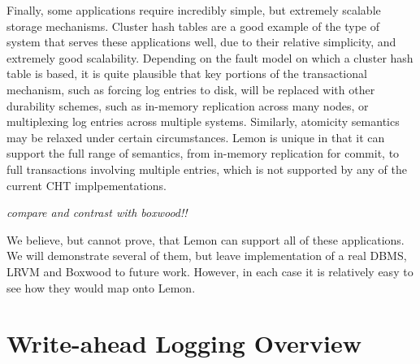 \documentclass[letterpaper,twocolumn,english]{article}
\newcommand{\yad}{Lemon\xspace}
\begin{document}

Finally, some applications require incredibly simple, but extremely
scalable storage mechanisms.  Cluster hash tables are a good example
of the type of system that serves these applications well, due to
their relative simplicity, and extremely good scalability.  Depending
on the fault model on which a cluster hash table is based, it is
quite plausible that key portions of the transactional mechanism, such
as forcing log entries to disk, will be replaced with other durability
schemes, such as in-memory replication across many nodes, or
multiplexing log entries across multiple systems.  Similarly,
atomicity semantics may be relaxed under certain circumstances.  \yad is unique in that it can support the full range of semantics, from in-memory replication for commit, to full transactions involving multiple entries, which is not supported by any of the current CHT implpementations.

{\em compare and contrast with boxwood!!}


We believe, but cannot prove, that \yad can support all of these
applications. We will demonstrate several of them, but leave implementation of a real
DBMS, LRVM and Boxwood to future work.  However, in each case it is
relatively easy to see how they would map onto \yad.


%


\section{Write-ahead Logging Overview}
\end{document}
